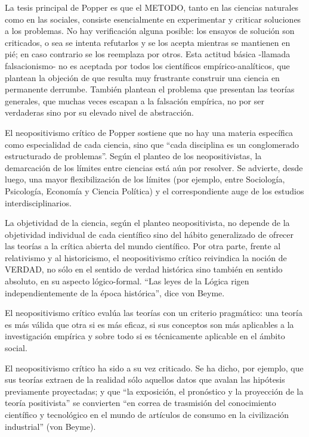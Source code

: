 \documentclass[
]{book}
\begin{document}
La tesis principal de Popper es que el METODO, tanto en las ciencias naturales como en las sociales, consiste esencialmente en experimentar y criticar soluciones a los problemas. No hay verificación alguna posible: los ensayos de solución son criticados, o sea se intenta refutarlos y se los acepta mientras se mantienen en pié; en caso contrario se los reemplaza por otros. Esta actitud básica -llamada falsacionismo- no es aceptada por todos los científicos empírico-analíticos, que plantean la objeción de que resulta muy frustrante construir una ciencia en permanente derrumbe. También plantean el problema que presentan las teorías generales, que muchas veces escapan a la falsación empírica, no por ser verdaderas sino por su elevado nivel de abstracción.

El neopositivismo crítico de Popper sostiene que no hay una materia específica como especialidad de cada ciencia, sino que ``cada disciplina es un conglomerado estructurado de problemas''. Según el planteo de los neopositivistas, la demarcación de los límites entre ciencias está aún por resolver. Se advierte, desde luego, una mayor flexibilización de los límites (por ejemplo, entre Sociología, Psicología, Economía y Ciencia Política) y el correspondiente auge de los estudios interdisciplinarios.

La objetividad de la ciencia, según el planteo neopositivista, no depende de la objetividad individual de cada científico sino del hábito generalizado de ofrecer las teorías a la crítica abierta del mundo científico. Por otra parte, frente al relativismo y al historicismo, el neopositivismo crítico reivindica la noción de VERDAD, no sólo en el sentido de verdad histórica sino también en sentido absoluto, en su aspecto lógico-formal. ``Las leyes de la Lógica rigen independientemente de la época histórica'', dice von Beyme.

El neopositivismo crítico evalúa las teorías con un criterio pragmático: una teoría es más válida que otra si es más eficaz, si sus conceptos son más aplicables a la investigación empírica y sobre todo si es técnicamente aplicable en el ámbito social.

El neopositivismo crítico ha sido a su vez criticado. Se ha dicho, por ejemplo, que sus teorías extraen de la realidad sólo aquellos datos que avalan las hipótesis previamente proyectadas; y que ``la exposición, el pronóstico y la proyección de la teoría positivista'' se convierten ``en correa de trasmisión del conocimiento científico y tecnológico en el mundo de artículos de consumo en la civilización industrial'' (von Beyme).
\end{document}
